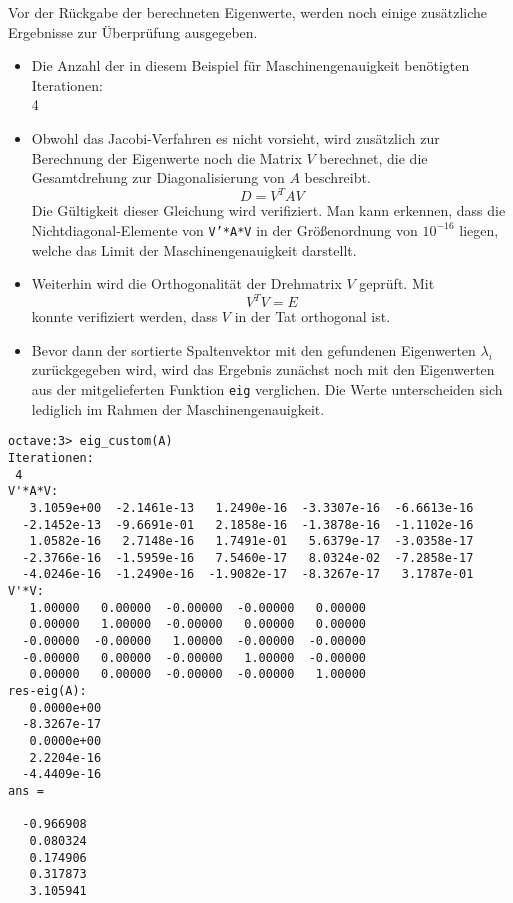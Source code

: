 Vor der Rückgabe der berechneten Eigenwerte, werden noch einige zusätzliche
Ergebnisse zur Überprüfung ausgegeben.
\begin{itemize}
 \item Die Anzahl der in diesem Beispiel für Maschinengenauigkeit benötigten Iterationen:\\
       4
 \item Obwohl das Jacobi-Verfahren es nicht vorsieht, wird zusätzlich zur Berechnung
       der Eigenwerte noch die Matrix $V$ berechnet, die die Gesamtdrehung zur
       Diagonalisierung von $A$ beschreibt.
       \[ D = V^TAV \]
       Die Gültigkeit dieser Gleichung wird verifiziert. Man kann erkennen, dass
       die Nichtdiagonal-Elemente von \texttt{V'*A*V} in der Größenordnung von
       $10^{-16}$ liegen, welche das Limit der Maschinengenauigkeit darstellt.
 \item Weiterhin wird die Orthogonalität der Drehmatrix $V$ geprüft. Mit
       \[ V^TV = E \]
       konnte verifiziert werden, dass $V$ in der Tat orthogonal ist.
 \item Bevor dann der sortierte Spaltenvektor mit den gefundenen Eigenwerten
       $λ_i$ zurückgegeben wird, wird das Ergebnis zunächst noch mit den
       Eigenwerten aus der mitgelieferten Funktion \texttt{eig} verglichen. Die
       Werte unterscheiden sich lediglich im Rahmen der Maschinengenauigkeit.
\end{itemize}

\begin{lstlisting}[caption=Output des
Funktionsaufrufs,label=lst:eig_custom_output]
octave:3> eig_custom(A)
Iterationen:
 4
V'*A*V:
   3.1059e+00  -2.1461e-13   1.2490e-16  -3.3307e-16  -6.6613e-16
  -2.1452e-13  -9.6691e-01   2.1858e-16  -1.3878e-16  -1.1102e-16
   1.0582e-16   2.7148e-16   1.7491e-01   5.6379e-17  -3.0358e-17
  -2.3766e-16  -1.5959e-16   7.5460e-17   8.0324e-02  -7.2858e-17
  -4.0246e-16  -1.2490e-16  -1.9082e-17  -8.3267e-17   3.1787e-01
V'*V:
   1.00000   0.00000  -0.00000  -0.00000   0.00000
   0.00000   1.00000  -0.00000   0.00000   0.00000
  -0.00000  -0.00000   1.00000  -0.00000  -0.00000
  -0.00000   0.00000  -0.00000   1.00000  -0.00000
   0.00000   0.00000  -0.00000  -0.00000   1.00000
res-eig(A):
   0.0000e+00
  -8.3267e-17
   0.0000e+00
   2.2204e-16
  -4.4409e-16
ans =

  -0.966908
   0.080324
   0.174906
   0.317873
   3.105941
\end{lstlisting}
